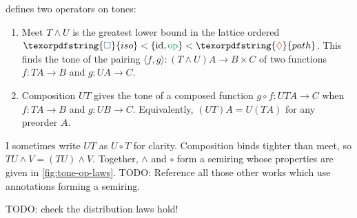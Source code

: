 \documentclass{rntz}
\newcommand{\todo}[1]{{\color{Purple}#1}}
\newcommand\opcolor{\color{ForestGreen}}
\newcommand\isocolor{\color{NavyBlue}}
\newcommand\pathcolor{\color{Bittersweet}}
\newcommand\id{\ensuremath{\mathrm{id}}}
\newcommand\op{\ensuremath{\mathrm{\opcolor op}}}
\newcommand\iso{\texorpdfstring{\ensuremath{{\isocolor\Box}}}{iso}}
\renewcommand\path{\texorpdfstring{\ensuremath{{\pathcolor\lozenge}}}{path}}
\newcommand\tc{\circ}                      %
\newcommand\tmeet{\wedge}                  %
\begin{document}
 defines two operators on tones:
\begin{enumerate}
\item Meet $T \tmeet U$ is the greatest lower bound in the lattice ordered $\iso
  < \{\id, \op\} < \path$. This finds the tone of the pairing $\langle f, g\rangle
  : (T \tmeet U)A \to B \times C$ of two functions $f : TA \to B$ and $g : UA
  \to C$.

\item Composition $UT$ gives the tone of a composed function $g \circ f : UTA
  \to C$ when $f : TA \to B$ and $g : UB \to C$. Equivalently, $(UT)A = U(TA)$
  for any preorder $A$.
\end{enumerate}

I sometimes write $UT$ as $U \tc T$ for clarity. Composition binds tighter than
meet, so $TU \tmeet V = (TU) \tmeet V$.
%
Together, $\tmeet$ and $\tc$ form a semiring whose properties are given in
\cref{fig:tone-op-laws}. \todo{TODO: Reference all those other works which use
  annotations forming a semiring.}

\todo{TODO: check the distribution laws hold!}
\end{document}

